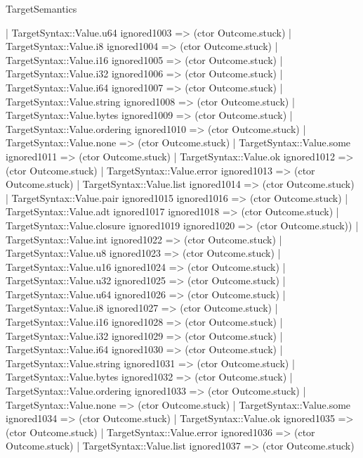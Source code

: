 \begin{lexlean}{TargetSemantics}
\begin{semanticmodule}
{                  | TargetSyntax::Value.u64 ignored1003 => (ctor Outcome.stuck)
                  | TargetSyntax::Value.i8 ignored1004 => (ctor Outcome.stuck)
                  | TargetSyntax::Value.i16 ignored1005 => (ctor Outcome.stuck)
                  | TargetSyntax::Value.i32 ignored1006 => (ctor Outcome.stuck)
                  | TargetSyntax::Value.i64 ignored1007 => (ctor Outcome.stuck)
                  | TargetSyntax::Value.string ignored1008 => (ctor Outcome.stuck)
                  | TargetSyntax::Value.bytes ignored1009 => (ctor Outcome.stuck)
                  | TargetSyntax::Value.ordering ignored1010 => (ctor Outcome.stuck)
                  | TargetSyntax::Value.none => (ctor Outcome.stuck)
                  | TargetSyntax::Value.some ignored1011 => (ctor Outcome.stuck)
                  | TargetSyntax::Value.ok ignored1012 => (ctor Outcome.stuck)
                  | TargetSyntax::Value.error ignored1013 => (ctor Outcome.stuck)
                  | TargetSyntax::Value.list ignored1014 => (ctor Outcome.stuck)
                  | TargetSyntax::Value.pair ignored1015 ignored1016 => (ctor Outcome.stuck)
                  | TargetSyntax::Value.adt ignored1017 ignored1018 => (ctor Outcome.stuck)
                  | TargetSyntax::Value.closure ignored1019 ignored1020 => (ctor Outcome.stuck))
                | TargetSyntax::Value.int ignored1022 => (ctor Outcome.stuck)
                | TargetSyntax::Value.u8 ignored1023 => (ctor Outcome.stuck)
                | TargetSyntax::Value.u16 ignored1024 => (ctor Outcome.stuck)
                | TargetSyntax::Value.u32 ignored1025 => (ctor Outcome.stuck)
                | TargetSyntax::Value.u64 ignored1026 => (ctor Outcome.stuck)
                | TargetSyntax::Value.i8 ignored1027 => (ctor Outcome.stuck)
                | TargetSyntax::Value.i16 ignored1028 => (ctor Outcome.stuck)
                | TargetSyntax::Value.i32 ignored1029 => (ctor Outcome.stuck)
                | TargetSyntax::Value.i64 ignored1030 => (ctor Outcome.stuck)
                | TargetSyntax::Value.string ignored1031 => (ctor Outcome.stuck)
                | TargetSyntax::Value.bytes ignored1032 => (ctor Outcome.stuck)
                | TargetSyntax::Value.ordering ignored1033 => (ctor Outcome.stuck)
                | TargetSyntax::Value.none => (ctor Outcome.stuck)
                | TargetSyntax::Value.some ignored1034 => (ctor Outcome.stuck)
                | TargetSyntax::Value.ok ignored1035 => (ctor Outcome.stuck)
                | TargetSyntax::Value.error ignored1036 => (ctor Outcome.stuck)
                | TargetSyntax::Value.list ignored1037 => (ctor Outcome.stuck)
}
\end{semanticmodule}
\end{lexlean}
